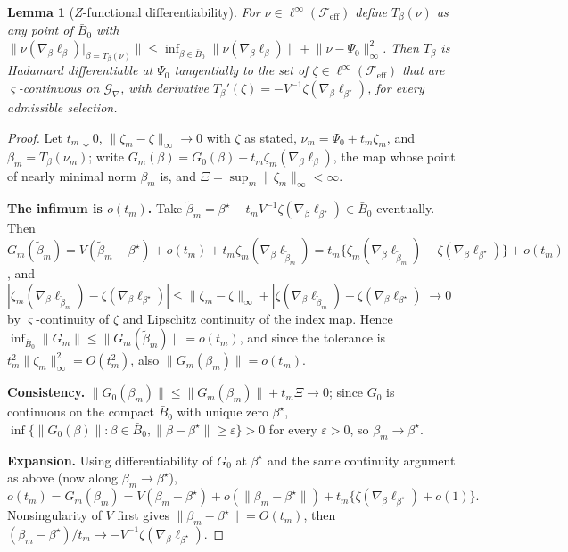 \documentclass[11pt]{article}
\newtheorem{lemma}{Lemma}
\newcommand{\calF}{\mathcal F}
\newcommand{\calG}{\mathcal G}
\newcommand{\eps}{\varepsilon}
\newcommand{\norm}[1]{\lVert #1\rVert}
\begin{document}
\begin{lemma}[$Z$-functional differentiability]\label{lem:zfun}
For $\nu\in\ell^\infty(\calF_{\mathrm{eff}})$ define $T_\beta(\nu)$ as any point of $\bar B_0$ with
$\norm{\nu(\nabla_\beta\ell_\beta)|_{\beta=T_\beta(\nu)}}\le\inf_{\beta\in\bar B_0}\norm{\nu(\nabla_\beta\ell_\beta)}+\norm{\nu-\Psi_0}_\infty^2$.
Then $T_\beta$ is Hadamard differentiable at $\Psi_0$ tangentially to the set of $\zeta\in\ell^\infty(\calF_{\mathrm{eff}})$ that are $\varsigma$-continuous on $\calG_\nabla$, with derivative $T_\beta'(\zeta)=-V^{-1}\zeta(\nabla_\beta\ell_{\beta^\star})$, for every admissible selection.
\end{lemma}

\begin{proof}
Let $t_m\downarrow0$, $\norm{\zeta_m-\zeta}_\infty\to0$ with $\zeta$ as stated, $\nu_m=\Psi_0+t_m\zeta_m$, and $\beta_m=T_\beta(\nu_m)$; write $G_m(\beta)=G_0(\beta)+t_m\zeta_m(\nabla_\beta\ell_\beta)$, the map whose point of nearly minimal norm $\beta_m$ is, and $\Xi=\sup_m\norm{\zeta_m}_\infty<\infty$.

\textbf{The infimum is $o(t_m)$.} Take $\tilde\beta_m=\beta^\star-t_mV^{-1}\zeta(\nabla_\beta\ell_{\beta^\star})\in\bar B_0$ eventually. Then
$G_m(\tilde\beta_m)=V(\tilde\beta_m-\beta^\star)+o(t_m)+t_m\zeta_m(\nabla_\beta\ell_{\tilde\beta_m})
=t_m\{\zeta_m(\nabla_\beta\ell_{\tilde\beta_m})-\zeta(\nabla_\beta\ell_{\beta^\star})\}+o(t_m)$,
and $|\zeta_m(\nabla_\beta\ell_{\tilde\beta_m})-\zeta(\nabla_\beta\ell_{\beta^\star})|\le\norm{\zeta_m-\zeta}_\infty+|\zeta(\nabla_\beta\ell_{\tilde\beta_m})-\zeta(\nabla_\beta\ell_{\beta^\star})|\to0$ by $\varsigma$-continuity of $\zeta$ and Lipschitz continuity of the index map. Hence $\inf_{\bar B_0}\norm{G_m}\le\norm{G_m(\tilde\beta_m)}=o(t_m)$, and since the tolerance is $t_m^2\norm{\zeta_m}^2_\infty=O(t_m^2)$, also $\norm{G_m(\beta_m)}=o(t_m)$.

\textbf{Consistency.} $\norm{G_0(\beta_m)}\le\norm{G_m(\beta_m)}+t_m\Xi\to0$; since $G_0$ is continuous on the compact $\bar B_0$ with unique zero $\beta^\star$, $\inf\{\norm{G_0(\beta)}:\beta\in\bar B_0,\norm{\beta-\beta^\star}\ge\eps\}>0$ for every $\eps>0$, so $\beta_m\to\beta^\star$.

\textbf{Expansion.} Using differentiability of $G_0$ at $\beta^\star$ and the same continuity argument as above (now along $\beta_m\to\beta^\star$),
\begin{equation*}
o(t_m)=G_m(\beta_m)=V(\beta_m-\beta^\star)+o(\norm{\beta_m-\beta^\star})+t_m\bigl\{\zeta(\nabla_\beta\ell_{\beta^\star})+o(1)\bigr\}.
\end{equation*}
Nonsingularity of $V$ first gives $\norm{\beta_m-\beta^\star}=O(t_m)$, then $(\beta_m-\beta^\star)/t_m\to-V^{-1}\zeta(\nabla_\beta\ell_{\beta^\star})$.
\end{proof}
\end{document}
